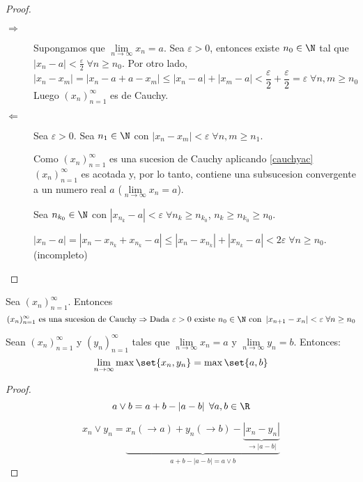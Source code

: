 \begin{proof}
	~
	\begin{description}
		\item[\(\Rightarrow\) ] Supongamos que  \(\lim\limits_{n \to \infty} x_n = a \). Sea \(\varepsilon > 0 \), entonces existe \(n_0 \in \N \) tal que \(\left\vert x_n - a  \right\vert < \frac{\varepsilon}{2} \; \forall n \geq n_0 \). Por otro lado, \[\left\vert x_n - x_m  \right\vert = \left\vert x_n - a + a - x_m  \right\vert \leq \left\vert x_n - a  \right\vert + \left\vert x_m - a  \right\vert < \frac{\varepsilon}{2} + \frac{\varepsilon}{2} = \varepsilon \; \forall n,m \geq n_0\] Luego \((x_n)^{\infty}_{n=1}\) es de Cauchy.
			
		\item[\(\Leftarrow\)] Sea \(\varepsilon > 0 \). Sea \(n_1 \in \N\) con \(\left\vert x_n - x_m  \right\vert < \varepsilon \; \forall n,m \geq n_1 \).
			
			Como \((x_n)^{\infty}_{n=1} \) es una sucesion de Cauchy aplicando \ref{cauchyac} \((x_n)^{\infty}_{n=1}  \) es acotada y, por lo tanto, contiene una subsucesion convergente a un numero real \(a \) (\(\lim\limits_{n \to \infty} x_n = a \)).
			
			Sea \(n_{k_0} \in \N \) con \(\left\vert x_{n_k} - a  \right\vert < \varepsilon \; \forall n_k \geq n_{k_0}\), \(n_k \geq n_{k_0} \geq n_0 \).
			
			\(\left\vert x_n - a  \right\vert = \left\vert x_n - x_{n_k} + x_{n_k} - a \right\vert \leq \left\vert x_n - x_{n_k } \right\vert + \left\vert x_{n_k} - a \right\vert < 2\varepsilon \; \forall n \geq n_0\). (incompleto)
	\end{description}
	
\end{proof}
\begin{remark}
	Sea \((x_n)^{\infty}_{n=1} \). Entonces
	\[
		(x_n)^{\infty}_{n=1} \text{ es una sucesion de Cauchy} \Rightarrow \text{Dada \(\varepsilon > 0 \) existe } n_0 \in \N \text{ con } \left\vert x_{n+1} - x_n  \right\vert < \varepsilon \; \forall n \geq n_0
	\]
	
\end{remark}

\begin{proposition}
	Sean \((x_n)^{\infty}_{n=1} \) y \((y_n)^{\infty}_{n=1} \) tales que \(\lim\limits_{n \to \infty} x_n = a \) y \(\lim\limits_{n \to \infty} y_n = b \). Entonces:
	\[
		\lim\limits_{n \to \infty} \max\set{x_n,y_n} = \max\set{a,b }
	\]
\end{proposition}
\begin{proof}
	\[a \vee b = a + b - \left\vert a - b  \right\vert \; \forall a,b \in \R \]
	
	\[x_n \vee y_n = \underbrace{x_n (\rightarrow a) + y_n (\rightarrow b) - \underbrace{\left\vert x_n - y_n  \right\vert}_{\rightarrow \left\vert a - b  \right\vert }}_{a + b - \left\vert a - b \right\vert = a \vee b} \]
\end{proof}
